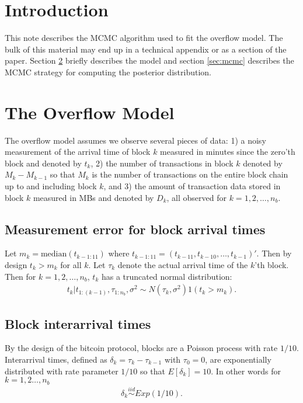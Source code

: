 \documentclass{article}
\begin{document}
\section{Introduction}
This note describes the MCMC algorithm used to fit the overflow model. The bulk of this material may end up in a technical appendix or as a section of the paper. Section \ref{sec:model} briefly describes the model and section \ref{sec:mcmc} describes the MCMC strategy for computing the posterior distribution.

\section{The Overflow Model}\label{sec:model}
The overflow model assumes we observe several pieces of data: 1) a noisy measurement of the arrival time of block $k$ measured in minutes since the zero'th block and denoted by $t_k$, 2) the number of transactions in block $k$ denoted by $M_k - M_{k-1}$ so that $M_k$ is the number of transactions on the entire block chain up to and including block $k$, and 3) the amount of transaction data stored in block $k$ measured in MBs and denoted by $D_k$, all observed for $k=1,2,\dots,n_{b}$.

\subsection{Measurement error for block arrival times}
Let $m_k = \mathrm{median}(t_{k - 1:11})$ where $t_{k-1:11} = (t_{k-11}, t_{k-10},\dots,t_{k-1})'$. Then by design $t_k > m_k$ for all $k$. Let $\tau_k$ denote the actual arrival time of the $k$'th block. Then for $k=1,2,\dots,n_{b}$, $t_k$ has a truncated normal distribution:
\begin{align*}
t_k |t_{1:(k-1)}, \tau_{1:n_{b}},\sigma^2 \sim N(\tau_k, \sigma^2)1(t_k > m_k).
\end{align*}

\subsection{Block interarrival times}
By the design of the bitcoin protocol, blocks are a Poisson process with rate $1/10$. Interarrival times, defined as $\delta_k = \tau_k - \tau_{k-1}$ with $\tau_0 = 0$, are exponentially distributed with rate parameter $1/10$ so that $E[\delta_k] = 10$. In other words for $k=1,2\dots,n_{b}$
\begin{align*}
\delta_k \stackrel{iid}{\sim} Exp(1/10).
\end{align*}
\end{document}
